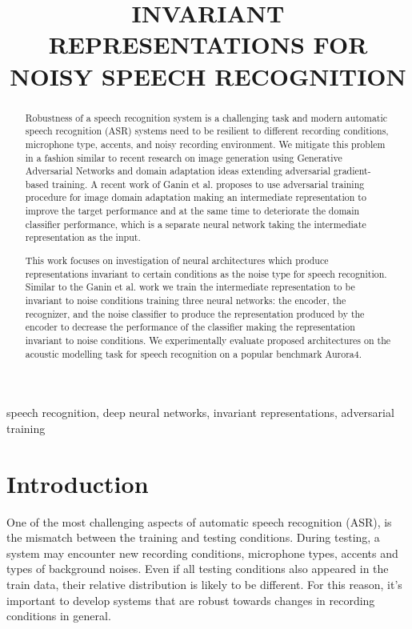 \documentclass{article}
\title{INVARIANT REPRESENTATIONS FOR NOISY SPEECH RECOGNITION}
\begin{document}
%
\maketitle
%
\begin{abstract}
    Robustness of a speech recognition system is a challenging task and modern
    automatic speech recognition (ASR) systems need to be resilient to different recording conditions,
    microphone type, accents, and noisy recording environment. We mitigate
    this problem in a fashion similar to recent research on image generation using
    Generative Adversarial Networks and domain adaptation ideas extending
    adversarial gradient-based training. A recent work of Ganin et al. proposes to
    use adversarial training procedure for image domain adaptation making an intermediate
    representation to improve the target performance and at the same time
    to deteriorate the domain classifier performance, which is a separate neural
    network taking the intermediate representation as the input.

    This work focuses on investigation of neural architectures which produce
    representations invariant to certain conditions as the noise type for speech
    recognition. Similar
    to the Ganin et al. work we train the intermediate representation to be invariant
    to noise conditions training three neural networks: the encoder, the recognizer, and the
    noise classifier to produce the representation produced by the encoder to decrease
    the performance of the classifier making the representation invariant to noise conditions. We
    experimentally evaluate proposed architectures on the acoustic modelling task
    for speech recognition on a popular benchmark Aurora4.
\end{abstract}
%
\begin{keywords}
speech recognition, deep neural networks, invariant representations, adversarial training
\end{keywords}
%
\section{Introduction}
\label{sec:intro}
    One of the most challenging aspects of automatic speech recognition (ASR),
    is the mismatch between the training and testing conditions. During
    testing, a system may encounter new recording conditions, microphone types,
    accents and types of background noises. Even if all testing conditions also appeared
    in the train data, their relative distribution is likely to be
    different. For this reason, it's important to develop systems that are
    robust towards changes in recording conditions in general.
\end{document}
